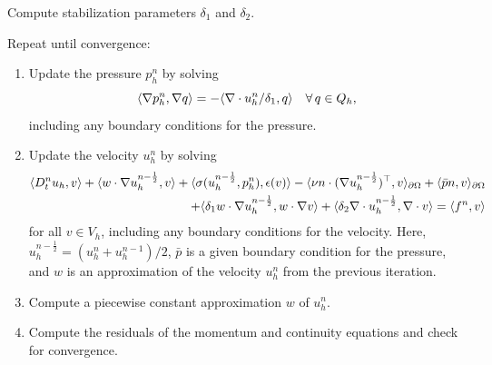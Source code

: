 {
  \item
    Compute stabilization parameters $\delta_1$ and $\delta_2$.

  \item
    Repeat until convergence:

    \begin{enumerate}
    \item
      Update the pressure $p^n_h$ by solving
      \begin{equation}\label{eq:g2_scheme,1}
        \renni{\nabla q}{\nabla p_h^n} = - \renni{q}{\nabla \cdot u_h^n/\delta_1}
        \quad \foralls q \in Q_h,
      \end{equation}
      including any boundary conditions for the pressure.

    \item
      Update the velocity $u^n_h$ by solving
      \begin{equation}\label{eq:g2_scheme,2}
        \begin{split}
          \renni{v}{D_t^n u_h}
          + \renni{v}{w \cdot \nabla u_h^{n-\frac{1}{2}}}
          + \renni{\epsilon(v)}{\sigma(u_h^{n-\frac{1}{2}}, p_h^n)}
          - \renni{v}{\nu n \cdot (\nabla u_h^{n-\frac{1}{2}})^{\top}}_{\partial\Omega}
          + \renni{v}{\bar{p} n}_{\partial\Omega} \\
          + \renni{w \cdot \nabla v}{\delta_1 w \cdot \nabla u_h^{n-\frac{1}{2}}}
          + \renni{\nabla \cdot v}{\delta_2 \nabla \cdot u_h^{n-\frac{1}{2}}}
          = \renni{v}{f^n}
        \end{split}
      \end{equation}
      for all $v \in V_h$, including any boundary conditions for the
      velocity. Here, $u_h^{n-\frac{1}{2}} = (u_h^n + u_h^{n-1}) / 2$,
      $\bar{p}$ is a given boundary condition for the pressure, and
      $w$ is an approximation of the velocity $u^n_h$ from the
      previous iteration.

    \item
      Compute a piecewise constant approximation $w$ of $u^n_h$.

    \item
      Compute the residuals of the momentum and continuity equations
      and check for convergence.

    \end{enumerate}
}

